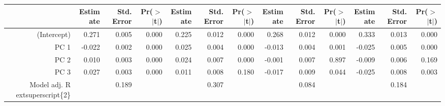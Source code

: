 \begin{table}[ht]
\centering
\begin{tabular}{rrrrrrrrrrrrr}
  \hline
 & Estimate & Std. Error & Pr($>$$|$t$|$) & Estimate & Std. Error & Pr($>$$|$t$|$) & Estimate & Std. Error & Pr($>$$|$t$|$) & Estimate & Std. Error & Pr($>$$|$t$|$) \\ 
  \hline
(Intercept) & 0.271 & 0.005 & 0.000 & 0.225 & 0.012 & 0.000 & 0.268 & 0.012 & 0.000 & 0.333 & 0.013 & 0.000 \\ 
  PC 1 & -0.022 & 0.002 & 0.000 & 0.025 & 0.004 & 0.000 & -0.013 & 0.004 & 0.001 & -0.025 & 0.005 & 0.000 \\ 
  PC 2 & 0.010 & 0.003 & 0.000 & 0.024 & 0.007 & 0.000 & -0.001 & 0.007 & 0.897 & -0.009 & 0.006 & 0.169 \\ 
  PC 3 & 0.027 & 0.003 & 0.000 & 0.011 & 0.008 & 0.180 & -0.017 & 0.009 & 0.044 & -0.025 & 0.008 & 0.003 \\ 
  Model adj. R	extsuperscript\{2\} &  & 0.189 &  &  & 0.307 &  &  & 0.084 &  &  & 0.184 &  \\ 
   \hline
\end{tabular}
\end{table}
